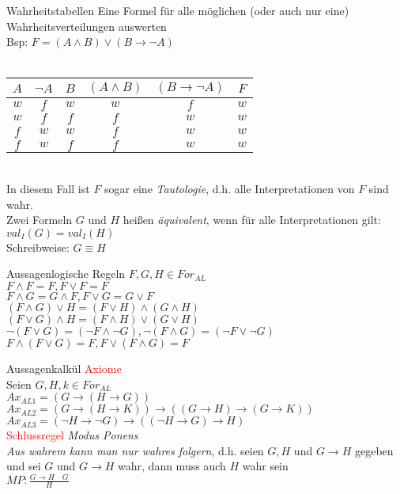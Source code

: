 \begin{frame}{Wahrheitstabellen}
	Eine Formel für alle möglichen (oder auch nur eine) Wahrheitsverteilungen auswerten\\
	Bsp: $F = (A\wedge B)\vee(B\rightarrow\neg A)$\\
	\textcolor{white}{.}\\ %
	\begin{tabular}{ccc|cc|c}
		$A$ & $\neg A$ & $B$ & $(A\wedge B)$ & $(B\rightarrow\neg A)$ & $F$ \\
		\hline
		$w$ & $f$      & $w$ & $w$           & $f$                    & $w$ \\
		$w$ & $f$      & $f$ & $f$           & $w$                    & $w$ \\
		$f$ & $w$      & $w$ & $f$           & $w$                    & $w$ \\
		$f$ & $w$      & $f$ & $f$           & $w$                    & $w$ \\
	\end{tabular}\\
	In diesem Fall ist $F$ sogar eine \emph{Tautologie}, d.h. alle Interpretationen von $F$ sind wahr.\\
	Zwei Formeln $G$ und $H$ heißen \emph{äquivalent}, wenn für alle Interpretationen gilt: $val_{I}(G) = val_{I}(H)$\\
	Schreibweise: $G\equiv H$\\
\end{frame}

\begin{frame}{Aussagenlogische Regeln}
	$F,G,H\in For_{AL}$\\
	$F\wedge F=F,F\vee F=F$\\
	$F\wedge G=G\wedge F, F\vee G=G\vee F$\\
	$(F\wedge G)\vee H=(F\vee H)\wedge(G\wedge H)$\\
	$(F\vee G)\wedge H=(F\wedge H)\vee(G\vee H)$\\
	$\neg(F\vee G)=(\neg F\wedge\neg G), \neg(F\wedge G)=(\neg F\vee\neg G)$\\
	$F\wedge(F\vee G)=F, F\vee(F\wedge G)=F$\\
\end{frame}
\begin{frame}{Aussagenkalkül}
	\textcolor{red}{Axiome}\\
	Seien $G,H,k\in For_{AL}$\\
	$Ax_{AL1} = (G\rightarrow(H\rightarrow G))$\\
	$Ax_{AL2} = (G\rightarrow(H\rightarrow K))\rightarrow((G\rightarrow H)\rightarrow(G\rightarrow K))$\\
	$Ax_{AL3} = (\neg H\rightarrow\neg G)\rightarrow((\neg H\rightarrow G)\rightarrow H)$\\
	\textcolor{red}{Schlussregel} \emph{Modus Ponens}\\
	\emph{Aus wahrem kann man nur wahres folgern}, d.h. seien $G, H$ und $G\rightarrow H$ gegeben und sei $G$ und $G\rightarrow H$ wahr, dann muss auch $H$ wahr sein\\
	$MP : \frac{G\rightarrow H\quad G}{H}$\\
\end{frame}
